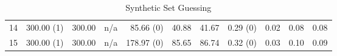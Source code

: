 \documentclass[11pt,fleqn,twoside]{article}
\begin{document}
\begin{table}[t]
\begin{tabular}[t]{|r|r|r|r|r|r|r|r|r|r|r|}
14     & 300.00 (1) & 300.00     & n/a     & 85.66 (0) & 40.88     & 41.67     & 0.29 (0) & 0.02     & 0.08     & 0.08     \\
15     & 300.00 (1) & 300.00     & n/a     & 178.97 (0) & 85.65     & 86.74     & 0.32 (0) & 0.03     & 0.10     & 0.09     \\
					\hline
				\end{tabular}
				\caption{Synthetic Set Guessing}
				\label{tab:synthetic}
			\end{table}
\end{document}
